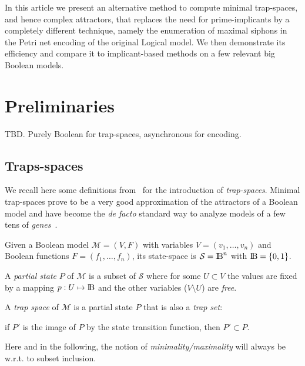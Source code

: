 \documentclass[runningheads]{llncs}
\newcommand{\bbbb}{{\rm I\!B}}
\begin{document}
In this article we present an alternative method to compute minimal trap-spaces, and hence complex attractors, that replaces the need for prime-implicants by a completely different technique, namely the enumeration of maximal siphons in the Petri net encoding of the original Logical model.
We then demonstrate its efficiency and compare it to implicant-based methods on a few relevant big Boolean models.


\section{Preliminaries}

TBD.
Purely Boolean for trap-spaces, asynchronous for encoding.

\subsection{Traps-spaces}

We recall here some definitions from~\cite{klarner2015computing} for the introduction of \emph{trap-spaces}.
Minimal trap-spaces prove to be a very good approximation of the attractors of a Boolean model and have become the \emph{de facto} standard way to analyze models of a few tens of \emph{genes}~\cite{klarner2017pyboolnet,cifuentes2020control}.

Given a Boolean model \(\mathcal{M} = (V, F)\) with variables \(V=(v_{1},\dots,v_{n})\) and Boolean functions \(F=(f_{1},\dots,f_{n})\), its state-space is \(\mathcal{S} =\bbbb^{n}\) with \(\bbbb = \{0, 1\}\).

A \emph{partial state} \(P\) of \(\mathcal{M}\) is a subset of \(\mathcal{S}\) where for some \(U\subset V\) the values are fixed by a mapping \(p: U\mapsto\bbbb\) and the other variables (\(V\setminus U\)) are \emph{free}.

\begin{definition}

  A \emph{trap space} of \(\mathcal{M}\) is a partial state \(P\) that is also a \emph{trap set}:

  if \(P'\) is the image of \(P\) by the state transition function, then \(P'\subset P\).

\end{definition}

Here and in the following, the notion of \emph{minimality/maximality} will always be w.r.t. to subset inclusion.
\end{document}
